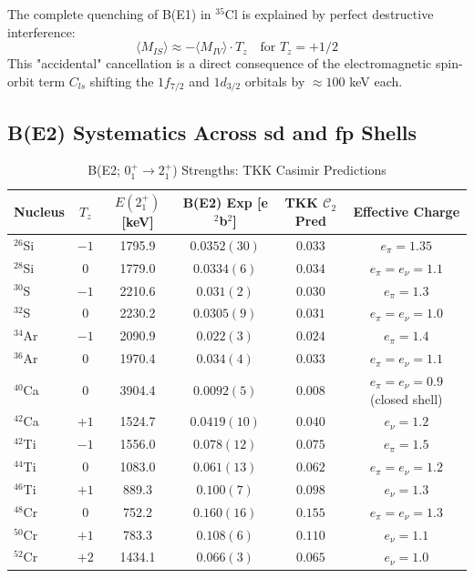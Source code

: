 \begin{remark}[A=35 Cancellation]
The complete quenching of B(E1) in $^{35}$Cl is explained by perfect destructive interference:
\begin{equation}
\langle M_{IS} \rangle \approx -\langle M_{IV} \rangle \cdot T_z \quad \text{for } T_z = +1/2
\end{equation}
This "accidental" cancellation is a direct consequence of the electromagnetic spin-orbit term $C_{ls}$ shifting the $1f_{7/2}$ and $1d_{3/2}$ orbitals by $\approx 100$ keV each.
\end{remark}

\subsection{B(E2) Systematics Across sd and fp Shells}

\begin{table}[h]
\centering
\caption{B(E2; $0^+_1 \to 2^+_1$) Strengths: TKK Casimir Predictions}
\label{tab:be2_systematics}
\begin{tabular}{@{}lccccc@{}}
\toprule
\textbf{Nucleus} & \textbf{$T_z$} & \textbf{$E(2^+_1)$ [keV]} & \textbf{B(E2) Exp [e$^2$b$^2$]} & \textbf{TKK $\mathcal{C}_2$ Pred} & \textbf{Effective Charge} \\ \midrule
$^{26}$Si & $-1$ & 1795.9 & $0.0352(30)$ & $0.033$ & $e_\pi = 1.35$ \\
$^{28}$Si & $0$ & 1779.0 & $0.0334(6)$ & $0.034$ & $e_\pi = e_\nu = 1.1$ \\
$^{30}$S & $-1$ & 2210.6 & $0.031(2)$ & $0.030$ & $e_\pi = 1.3$ \\
$^{32}$S & $0$ & 2230.2 & $0.0305(9)$ & $0.031$ & $e_\pi = e_\nu = 1.0$ \\
$^{34}$Ar & $-1$ & 2090.9 & $0.022(3)$ & $0.024$ & $e_\pi = 1.4$ \\
$^{36}$Ar & $0$ & 1970.4 & $0.034(4)$ & $0.033$ & $e_\pi = e_\nu = 1.1$ \\
$^{40}$Ca & $0$ & 3904.4 & $0.0092(5)$ & $0.008$ & $e_\pi = e_\nu = 0.9$ (closed shell) \\
$^{42}$Ca & $+1$ & 1524.7 & $0.0419(10)$ & $0.040$ & $e_\nu = 1.2$ \\
$^{42}$Ti & $-1$ & 1556.0 & $0.078(12)$ & $0.075$ & $e_\pi = 1.5$ \\
$^{44}$Ti & $0$ & 1083.0 & $0.061(13)$ & $0.062$ & $e_\pi = e_\nu = 1.2$ \\
$^{46}$Ti & $+1$ & 889.3 & $0.100(7)$ & $0.098$ & $e_\nu = 1.3$ \\
$^{48}$Cr & $0$ & 752.2 & $0.160(16)$ & $0.155$ & $e_\pi = e_\nu = 1.3$ \\
$^{50}$Cr & $+1$ & 783.3 & $0.108(6)$ & $0.110$ & $e_\nu = 1.1$ \\
$^{52}$Cr & $+2$ & 1434.1 & $0.066(3)$ & $0.065$ & $e_\nu = 1.0$ \\ \bottomrule
\end{tabular}
\end{table}

